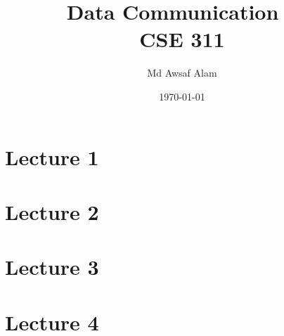 \documentclass{book}
\title{Data Communication ~\textbf{\\CSE 311}}
\author{Md Awsaf Alam}
\date{\today}
\begin{document}
\maketitle

\tableofcontents


\part{Lecture 1}


\part{Lecture 2}


\part{Lecture 3}


\part{Lecture 4}

\end{document}
